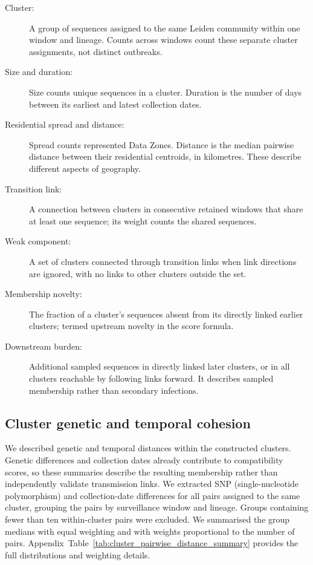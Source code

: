\FloatBarrier

\begin{tcolorbox}[
    title=Glossary: cluster summaries and links,
    halign=left,
    fontupper=\small,
    ]
    \begin{description}
        \item[Cluster:] A group of sequences assigned to the same Leiden community within one window and lineage. Counts across windows count these separate cluster assignments, not distinct outbreaks.
        \item[Size and duration:] Size counts unique sequences in a cluster. Duration is the number of days between its earliest and latest collection dates.
        \item[Residential spread and distance:] Spread counts represented Data Zones. Distance is the median pairwise distance between their residential centroids, in kilometres. These describe different aspects of geography.
        \item[Transition link:] A connection between clusters in consecutive retained windows that share at least one sequence; its weight counts the shared sequences.
        \item[Weak component:] A set of clusters connected through transition links when link directions are ignored, with no links to other clusters outside the set.
        \item[Membership novelty:] The fraction of a cluster's sequences absent from its directly linked earlier clusters; termed upstream novelty in the score formula.
        \item[Downstream burden:] Additional sampled sequences in directly linked later clusters, or in all clusters reachable by following links forward. It describes sampled membership rather than secondary infections.
    \end{description}
\end{tcolorbox}

\subsection{Cluster genetic and temporal cohesion}\label{sec:ch5_pairwise_distance_summary}

We described genetic and temporal distances within the constructed clusters. Genetic differences and collection dates already contribute to compatibility scores, so these summaries describe the resulting membership rather than independently validate transmission links. We extracted SNP (single-nucleotide polymorphism) and collection-date differences for all pairs assigned to the same cluster, grouping the pairs by surveillance window and lineage. Groups containing fewer than ten within-cluster pairs were excluded. We summarised the group medians with equal weighting and with weights proportional to the number of pairs. Appendix~Table~\ref{tab:cluster_pairwise_distance_summary} provides the full distributions and weighting details.

